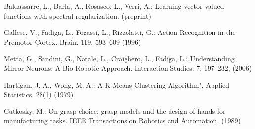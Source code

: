 \begin{thebibliography}{4}
 Baldassarre, L., Barla, A.,  Rosasco, L., Verri, A.:
Learning vector valued functions with spectral regularization. (preprint)




 Gallese, V., Fadiga, L., Fogassi, L., Rizzolatti, G.: Action Recognition in the Premotor Cortex. Brain. 119, 593–609 (1996)


 Metta, G., Sandini, G., Natale, L., Craighero, L., Fadiga, L.: Understanding  Mirror Neurons: A Bio-Robotic Approach. Interaction Studies. 7, 197–232, (2006)





 Hartigan, J. A., Wong, M. A.: A K-Means Clustering Algorithm". Applied Statistics. 28(1) (1979) 

 Cutkosky, M.: On grasp choice, grasp models and the design of hands for manufacturing tasks. IEEE Transactions on Robotics and
Automation. (1989)


\end{thebibliography}

